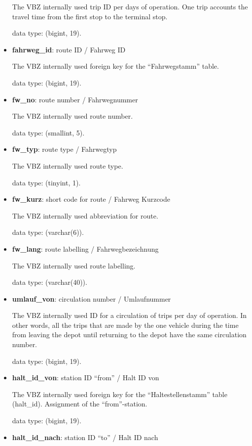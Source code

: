 \documentclass[11pt]{article}
\begin{document}
\begin{itemize}
	The VBZ internally used trip ID per days of operation. One trip accounts the travel time from the first stop to the terminal stop.
	
	data type: (bigint, 19).
	
	\item \textbf{fahrweg\_id}: route ID / Fahrweg ID
	
	The VBZ internally used foreign key for the ``Fahrwegstamm'' table.
	
	data type: (bigint, 19).
	
	\item \textbf{fw\_no}: route number / Fahrwegnummer
	
	The VBZ internally used route number.
	
	data type: (smallint, 5).
	
	\item \textbf{fw\_typ}: route type / Fahrwegtyp
	
	The VBZ internally used route type.
	
	data type: (tinyint, 1).
	
	\item \textbf{fw\_kurz}: short code for route / Fahrweg Kurzcode
	
	The VBZ internally used abbreviation for route.
	
	data type: (varchar(6)).
	
	\item \textbf{fw\_lang}: route labelling / Fahrwegbezeichnung
	
	The VBZ internally used route labelling.
	
	data type: (varchar(40)).
	
	\item \textbf{umlauf\_von}: circulation number / Umlaufnummer
	
	The VBZ internally used ID for a circulation of trips per day of operation. In other words, all the trips that are made by the one vehicle during the time from leaving the depot until returning to the depot have the same circulation number.
	
	data type: (bigint, 19).
	
	\item \textbf{halt\_id\_von}: station ID ``from'' / Halt ID von
	
	The VBZ internally used foreign key for the ``Haltestellenstamm'' table (halt\_id). Assignment of the ``from''-station. 
	
	data type: (bigint, 19).
	
	\item \textbf{halt\_id\_nach}: station ID ``to'' / Halt ID nach
	

\end{itemize}
\end{document}
